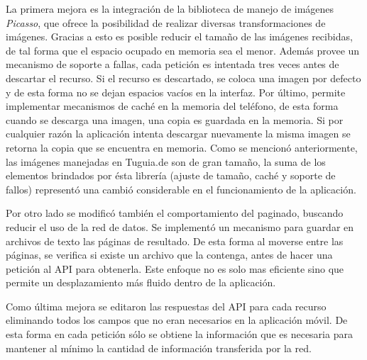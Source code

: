 La primera mejora es la integración de la biblioteca de manejo de imágenes \textit{Picasso}, que ofrece la posibilidad de realizar diversas transformaciones de imágenes. Gracias a esto es posible reducir el tamaño de las imágenes recibidas, de tal forma que el espacio ocupado en memoria sea el menor. Además provee un mecanismo de soporte a fallas, cada petición es intentada tres veces antes de descartar el recurso. Si el recurso es descartado, se coloca una imagen por defecto y de esta forma no se dejan espacios vacíos en la interfaz. Por último, permite implementar mecanismos de caché en la memoria del teléfono, de esta forma cuando se descarga una imagen, una copia es guardada en la memoria. Si por cualquier razón la aplicación intenta descargar nuevamente la misma imagen se retorna la copia que se encuentra en memoria. Como se mencionó anteriormente, las imágenes manejadas en Tuguia.de son de gran tamaño, la suma de los elementos brindados por ésta librería (ajuste de tamaño, caché y soporte de fallos) representó una cambió considerable en el funcionamiento de la aplicación. 

Por otro lado se modificó también el comportamiento del paginado, buscando reducir el uso de la red de datos. Se implementó un mecanismo para guardar en archivos de texto las páginas de resultado. De esta forma al moverse entre las páginas, se verifica si existe un archivo que la contenga, antes de hacer una petición al API para obtenerla. Este enfoque no es solo mas eficiente sino que permite un desplazamiento más fluido dentro de la aplicación.

Como última mejora se editaron las respuestas del API para cada recurso eliminando todos los campos que no eran necesarios en la aplicación móvil. De esta forma en cada petición sólo se obtiene la información que es necesaria para mantener  al mínimo la cantidad de información transferida por la red.




